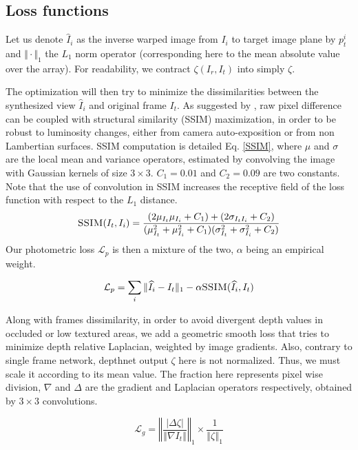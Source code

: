 \documentclass[runningheads]{llncs}
\begin{document}
\subsection{Loss functions}
 Let us denote $\widehat{I}_i$ as the inverse warped image from $I_i$ to target image plane by $p^i_t$ and $\Vert\cdot\Vert_1$
the $L_1$ norm operator (corresponding here to the mean absolute value over the array).
For readability, we contract $\zeta(I_r, I_t)$ into simply $\zeta$.

The optimization will then try to minimize the dissimilarities between the synthesized view $\widehat{I}_i$ and original frame $I_t$. As suggested by \cite{monodepth17}, raw pixel difference can be coupled with structural similarity (SSIM) \cite{wang2004image} maximization, in order to be robust to luminosity changes, either from camera auto-exposition or from non Lambertian surfaces. SSIM computation is detailed Eq. \ref{SSIM}, where $\mu$ and $\sigma$ are the local mean and variance operators, estimated by convolving
the image with Gaussian kernels of size $3 \times 3$.
$C_1 = 0.01$ and $C_2 = 0.09$ are two constants.
Note that the use of convolution in SSIM increases the receptive field of the loss function with respect to the $L_1$ distance.
\begin{equation}
\label{SSIM}
 \textsc{SSIM}(I_t, I_i) = \frac{(2\mu_{I_t}\mu_{I_i} + C_1) + (2 \sigma _{I_tI_i} + C_2)}
    {(\mu_{I_t}^2 + \mu_{I_i}^2+C_1) (\sigma_{I_t}^2 + \sigma_{I_i}^2+C_2)}
\end{equation}
Our photometric loss $\mathcal{L}_p$ is then a mixture of the two, $\alpha$ being an empirical weight.

\begin{equation}
\mathcal{L}_p = \sum_i \Vert \widehat{I}_i - I_t\Vert_1 - \alpha \textsc{SSIM}(\widehat{I}_i, I_t)
\end{equation}

Along with frames dissimilarity, in order to avoid divergent depth values in occluded or low textured areas, we add a geometric smooth loss that tries to minimize depth relative Laplacian, weighted by image gradients. Also, contrary to single frame network, depthnet output $\zeta$ here is not normalized. Thus, we must scale it according to its mean value. The fraction here represents pixel wise division, $\nabla$ and $\Delta$ are the gradient and Laplacian operators respectively, obtained by $3\times3$ convolutions.

\begin{equation}
\mathcal{L}_g = \left\Vert\frac{|\Delta \zeta|}{\left\Vert\nabla I_t\right\Vert}\right\Vert_1 \times \frac{1}{\left\Vert \zeta \right\Vert_1}
\end{equation}
\end{document}
